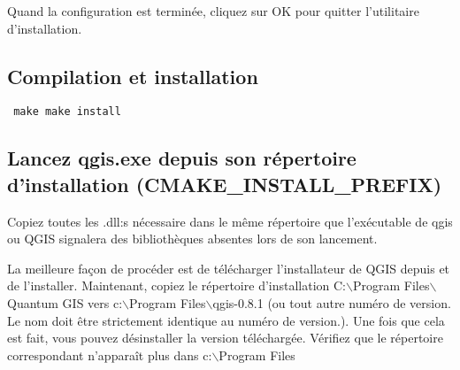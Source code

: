 Quand la configuration est termin\'ee, cliquez sur OK pour quitter l'utilitaire d'installation.

\subsection{Compilation et installation}
\begin{verbatim}
 make make install 
\end{verbatim}

% 
% 

\subsection{Lancez qgis.exe depuis son r\'epertoire d'installation (CMAKE\_INSTALL\_PREFIX)}
Copiez toutes les .dll:s n\'ecessaire dans le m\^eme r\'epertoire que l'ex\'ecutable de qgis ou QGIS signalera des biblioth\`eques absentes lors de son lancement.

La meilleure fa\c{c}on de proc\'eder est de t\'el\'echarger l'installateur de QGIS depuis  et de l'installer. Maintenant, copiez le r\'epertoire d'installation C:$\backslash$Program Files$\backslash$Quantum GIS
vers c:$\backslash$Program Files$\backslash$qgis-0.8.1 (ou tout autre num\'ero de version. Le nom doit \^etre strictement identique au num\'ero de version.). Une fois que cela est fait, vous pouvez d\'esinstaller la version t\'el\'echarg\'ee. V\'erifiez que le r\'epertoire correspondant n'appara\^it plus dans c:$\backslash$Program Files 

